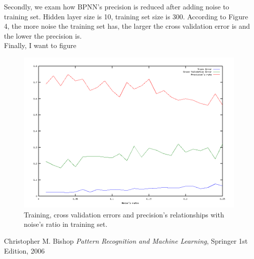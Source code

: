 \documentclass[a4paper, 11pt]{article}
\begin{document}
Secondly, we exam how BPNN's precision is reduced after adding noise to training set. Hidden layer size is 10, training set size is 300. According to Figure 4, the more noise the training set has, the larger the cross validation error is and the lower the precision is. \\
Finally, I want to figure 
\begin{figure}[t]
  \centering
  \includegraphics[scale=0.45]{3}
  \caption{Training, cross validation errors and precision's relationships with noise's ratio in training set.}
  \label{fig:m3}
\end{figure}

\begin{thebibliography}{9}
  \label{itm:PRML}
  Christopher M. Bishop
  \emph{Pattern Recognition and Machine Learning},
  Springer
  1st Edition,
  2006

\end{thebibliography}
\end{document}
